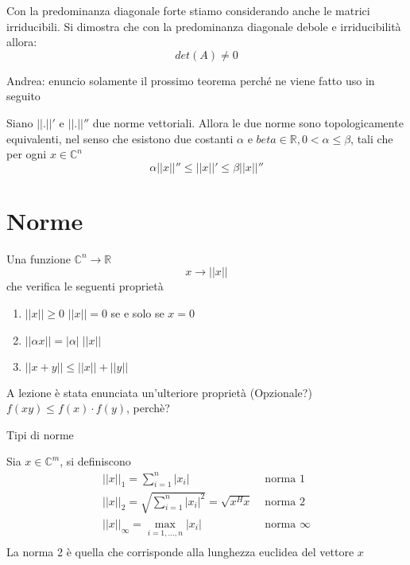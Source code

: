 Con la predominanza diagonale forte stiamo considerando anche le matrici irriducibili.
Si dimostra che con la predominanza diagonale debole e irriducibilit\`a
allora:
 $$det(A) \neq 0 $$

\begin{notes}
 Andrea: enuncio solamente il prossimo teorema perch\'e ne viene
fatto uso in seguito
\end{notes}

\begin{theo}
\label{norme:equivalenzanorme}
Siano $||.||'$ e $||.||''$ due norme vettoriali. Allora le due norme
sono topologicamente equivalenti, nel senso che esistono due costanti
$\alpha$ e $beta \in \mathbb{R}, 0 < \alpha \leq \beta$, tali che per ogni
$x \in \mathbb{C}^{n}$
$$ \alpha ||x||'' \leq ||x||' \leq \beta||x||''$$
\end{theo}




\section{Norme}

\begin{defn}[Norma]
Una funzione $\mathbb{C}^{n} \rightarrow \mathbb{R}$
$$ x \rightarrow ||x||$$
che verifica le seguenti propriet\`a
\begin{enumerate}
 \item $||x|| \geq 0$ \qquad $||x||  = 0 $ se e solo se $x=0$
 \item $||\alpha x|| = |\alpha| \; ||x||$
 \item $||x+y|| \leq ||x|| + ||y||$ 
\end{enumerate}
\begin{notes}
A lezione \`e stata enunciata un'ulteriore propriet\`a
  (Opzionale?) $f(xy) \leq f(x)\cdot f(y) $,
 perch\`e? 
\end{notes}
\end{defn}

Tipi di norme
\begin{defn}
Sia $x \in \mathbb{C}^{m}$, si definiscono
$$
\begin{array}{ll}
   || x ||_{1} =  \displaystyle \sum_{i=1}^{n}|x_i| & \text{ norma  } 1 \\
   || x ||_{2} = \sqrt{\displaystyle \sum_{i=1}^n |x_i|^2} = \sqrt{x^{H}x}
  & \text{ norma  } 2 \\
   || x ||_{\infty} =  \displaystyle \max_{i=1, \ldots, n}|x_i|
      & \text{ norma  } \infty \\
\end{array}
$$
La norma 2 \`e quella che corrisponde alla lunghezza euclidea del vettore $x$
\end{defn}

